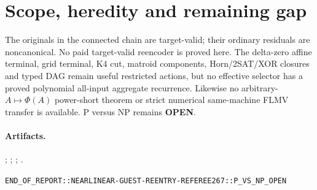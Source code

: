 \documentclass[11pt]{article}
\newcommand{\OPEN}{\textbf{OPEN}}
\begin{document}
\section{Scope, heredity and remaining gap}
The originals in the connected chain are target-valid; their ordinary
residuals are noncanonical.  No paid target-valid reencoder is proved here.
The delta-zero affine terminal, grid terminal, K4 cut, matroid components,
Horn/2SAT/XOR closures and typed DAG remain useful restricted actions, but no
effective selector has a proved polynomial all-input aggregate recurrence.
Likewise no arbitrary-$A\mapsto\Phi(A)$ power-short theorem or strict numerical
same-machine FLMV transfer is available.  P versus NP remains \OPEN.

\paragraph{Artifacts.}
;
;
;
.

\bigskip\noindent
\texttt{END\_OF\_REPORT::NEARLINEAR-GUEST-REENTRY-REFEREE267::P\_VS\_NP\_OPEN}
\end{document}
